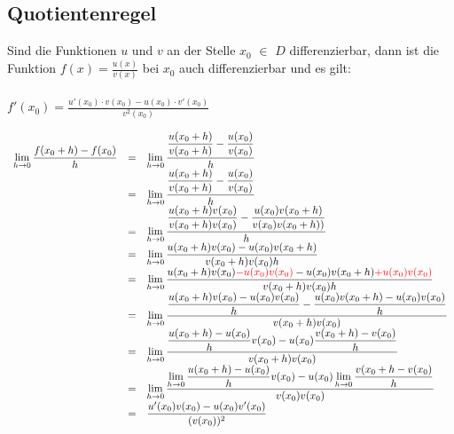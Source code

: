 \subsection{Quotientenregel}
\begin{Definition}
Sind die Funktionen $u$ und $v$ an der Stelle $x_{0}$ $\in$ $D$ differenzierbar, dann ist die Funktion $f(x)=\frac{u(x)} {v(x)}$ bei $x_{0}$ auch differenzierbar und es gilt: \\
\\
$f'(x_{0})=\frac{u'(x_{0})\cdot v(x_{0})-u(x_{0})\cdot v'(x_{0})}{v^2(x_{0})}$\\
\end{Definition}
\begin{Beweis}
$
\begin{array}{rcl}
\lim\limits_{h \rightarrow 0} {\dfrac{f(x_{0}+h)-f(x_{0})}{h}}&=& \lim\limits_{h \rightarrow 0} { \dfrac{ \dfrac{u(x_{0}+h)} {v(x_{0}+h)}- \dfrac{u(x_{0})}  {v(x_{0})}}  {h}}\\
&=&\lim\limits_{h \rightarrow 0} {\dfrac{\dfrac {u(x_{0}+h)}{v(x_{0}+h)}-\dfrac {u(x_{0})} {v(x_{0})}}   {h}}\\
&=&\lim\limits_{h \rightarrow 0} {\dfrac {\dfrac{  u(x_{0}+h)v(x_{0})}{v(x_{0}+h)v(x_{0})}   -\dfrac{u(x_{0})v(x_{0}+h)}{v(x_{0})v(x_{0}+h))}} {h}}\\
&=&\lim\limits_{h \rightarrow 0} {\dfrac     {u(x_{0}+h)v(x_{0})-u(x_{0})v(x_{0}+h)}    {v(x_{0}+h)v(x_{0})h }}\\
&=&\lim\limits_{h \rightarrow 0} {\dfrac {u(x_{0}+h)v(x_{0}) \textcolor{red}{-u(x_{0})v(x_{0})} -u(x_{0})v(x_{0}+h) \textcolor{red}{+u(x_{0})v(x_{0})}}  {v(x_{0}+h)v(x_{0})h}   }\\
&=&\lim\limits_{h \rightarrow 0} {\dfrac   {\dfrac{u(x_{0}+h)v(x_{0})-u(x_{0})v(x_{0})}{h}  -   \dfrac{u(x_{0})v(x_{0}+h)-u(x_{0})v(x_{0})} {h} }    {v(x_{0}+h)v(x_{0})}}\\
&=&\lim\limits_{h \rightarrow 0} { \dfrac     {\dfrac{u(x_{0}+h)-u(x_{0})}{h} v(x_{0})  -   u(x_{0}) \dfrac   {v(x_{0}+h)-v(x_{0})}  {h}  }         {v(x_{0}+h)v(x_{0})}     }\\
&=&\lim\limits_{h \rightarrow 0} { \dfrac  {\lim\limits_{h \rightarrow 0} {\dfrac{u(x_{0}+h)-u(x_{0})}{h}   }v(x_{0})  - u(x_{0}) \lim\limits_{h \rightarrow 0} { \dfrac{ v(x_{0}+h-v(x_{0})}{h}   }  }      {v(x_{0})v(x_{0})}}    \\
&=& { \dfrac{u'(x_{0})v(x_{0})-u(x_{0})v'(x_{0})} {(v(x_{0}))^2}    }\\
\end{array}
$
\end{Beweis}

